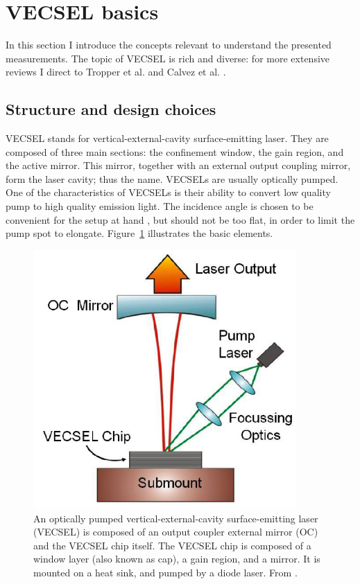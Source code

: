 \section{VECSEL basics}
\label{sec:basics}

In this section
I introduce the concepts
relevant to understand
the presented measurements.
The topic of VECSEL
is rich and diverse:
for more extensive reviews
I direct to
Tropper et al. \cite{Tropper2006}
and Calvez et al. \cite{Calvez2009}.

\subsection{Structure and design choices}

VECSEL
stands for
vertical-external-cavity
surface-emitting
laser.
They
are composed of
three main sections:
the confinement window,
the gain region,
and the active mirror.
This mirror,
together with
an external output coupling mirror,
form the laser cavity;
thus the name.
VECSELs are usually
optically pumped.
One of the characteristics
of VECSELs
is their ability
to convert low quality pump
to high quality emission light.
The incidence angle
is chosen to be convenient
for the setup at hand \cite{Tropper2006},
but should not be too flat,
in order to limit
the pump spot to elongate.
Figure~\ref{img:vecsel_principle}
illustrates the basic elements.

\begin{figure}
\centering
\includegraphics[width=10cm]{img/vecsel_principle.png}
\caption{An optically pumped
vertical-external-cavity
surface-emitting laser
(VECSEL)
is composed of
an output coupler
external mirror (OC)
and the VECSEL chip itself.
The VECSEL chip is composed of
a window layer
(also known as cap),
a gain region,
and a mirror.
It is mounted
on a heat sink,
and pumped
by a diode laser.
From \cite{Sirbu2014SPIE}.}
\label{img:vecsel_principle}
\end{figure}

